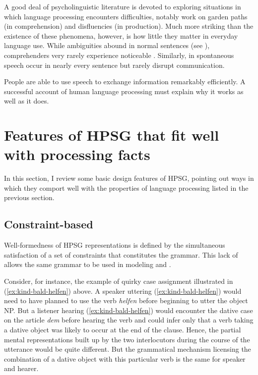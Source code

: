 \documentclass[output=paper
                ,modfonts
                ,nonflat
	        ,collection
	        ,collectionchapter
	        ,collectiontoclongg
 	        ,biblatex
                ,babelshorthands
                ,newtxmath
                ,draftmode
                ,colorlinks, citecolor=brown
]{./langsci/langscibook}
\begin{document}
A good deal of psycholinguistic literature is devoted to exploring situations in which language processing encounters difficulties, notably work on garden paths (in comprehension) and disfluencies (in production).  Much more striking than the existence of these phenomena, however, is how little they matter in everyday language use.  While ambiguities abound in normal sentences (see \citealt{Wasow2015}), comprehenders very rarely experience noticeable .  Similarly,  in spontaneous speech occur in nearly every sentence but rarely disrupt communication.  

People are able to use speech to exchange information remarkably efficiently.  A successful account of human language processing must explain why it works as well as it does.  

\section{Features of HPSG that fit well with processing facts}
\label{sec-features-of-HPSG}

In this section, I review some basic design features of HPSG, pointing out ways in which they comport well with the properties of language processing listed in the previous section.

\subsection{Constraint-based}
\label{sec-processing-constraint-based}

Well-formedness of HPSG representations is defined by the simultaneous satisfaction of a set of
constraints that constitutes the grammar.  This lack of  allows the same grammar
to be used in modeling  and .

Consider, for instance, the example of quirky case assignment illustrated in (\ref{ex:kind-bald-helfen}) above.  A speaker uttering (\ref{ex:kind-bald-helfen}) would need to have planned to use the verb \emph{helfen} before beginning to utter the object NP.  But a listener hearing (\ref{ex:kind-bald-helfen}) would encounter the dative case on the article \emph{dem} before hearing the verb and could infer only that a verb taking a dative object was likely to occur at the end of the clause.  Hence, the partial mental representations built up by the two interlocutors during the course of the utterance would be quite different.  But the grammatical mechanism licensing the combination of a dative object with this particular verb is the same for speaker and hearer. 
\end{document}
